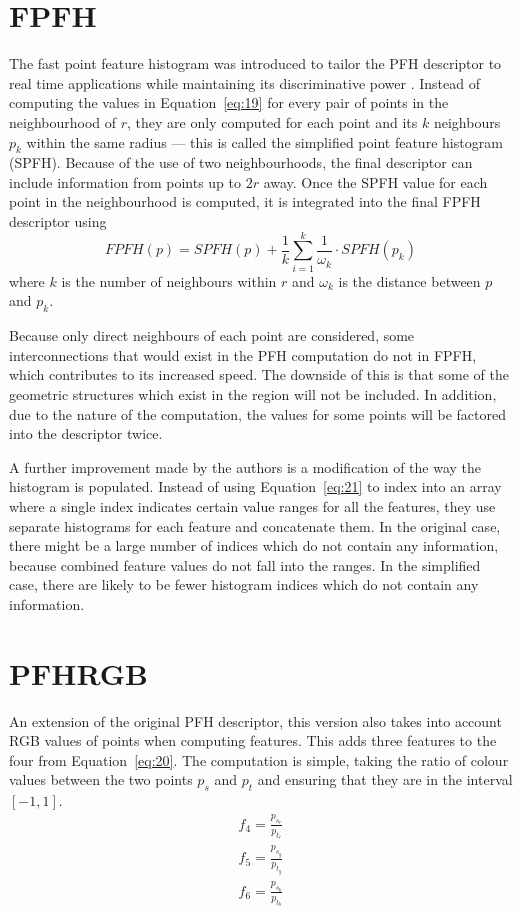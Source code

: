 \documentclass[11pt,a4paper]{kth-mag}
\begin{document}
\section{FPFH}
The fast point feature histogram was introduced to tailor the PFH descriptor to
real time applications while maintaining its discriminative power
\cite{rusu2009fast}. Instead of computing the values in Equation~\eqref{eq:19}
for every pair of points in the neighbourhood of $r$, they are only computed for
each point and its $k$ neighbours $p_k$ within the same radius --- this is
called the simplified point feature histogram (SPFH). Because of the use of two
neighbourhoods, the final descriptor can include information from points up to
$2r$ away. Once the SPFH value for each point in the neighbourhood is computed,
it is integrated into the final FPFH descriptor using
\begin{equation}
  \label{eq:20}
  FPFH(p)=SPFH(p)+\frac{1}{k}\sum^k_{i=1}\frac{1}{\omega_k}\cdot SPFH(p_k)
\end{equation}
where $k$ is the number of neighbours within $r$ and $\omega_k$ is the distance
between $p$ and $p_k$.

Because only direct neighbours of each point are considered, some
interconnections that would exist in the PFH computation do not in FPFH, which
contributes to its increased speed. The downside of this is that some of the
geometric structures which exist in the region will not be included. In
addition, due to the nature of the computation, the values for some points will
be factored into the descriptor twice.

A further improvement made by the authors is a modification of the way the
histogram is populated. Instead of using Equation~\eqref{eq:21} to index into
an array where a single index indicates certain value ranges for all the
features, they use separate histograms for each feature and concatenate them.
In the original case, there might be a large number of indices which do not
contain any information, because combined feature values do not fall into the
ranges. In the simplified case, there are likely to be fewer histogram indices
which do not contain any information.
\section{PFHRGB}
An extension of the original PFH descriptor, this version also takes into
account RGB values of points when computing features. This adds three features
to the four from Equation~\eqref{eq:20}. The computation is simple, taking the
ratio of colour values between the two points $p_s$ and $p_t$ and ensuring that
they are in the interval $\left[-1,1\right]$.
\begin{align}
  \label{eq:22}
  f_4=\frac{p_{s_r}}{p_{t_r}}\\
  f_5=\frac{p_{s_g}}{p_{t_g}}\\
  f_6=\frac{p_{s_b}}{p_{t_b}}
\end{align}
\end{document}
